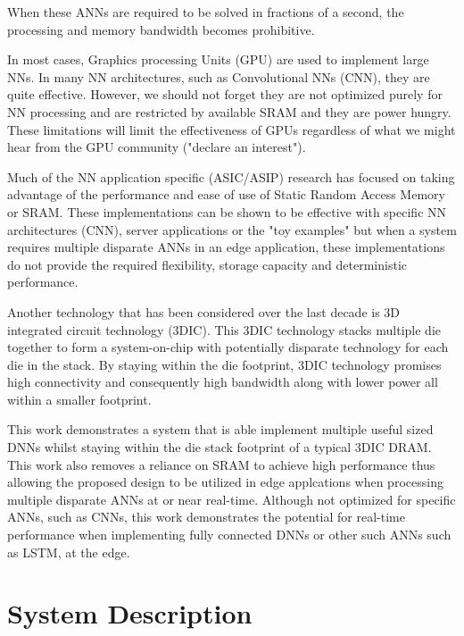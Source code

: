 \documentclass[journal]{IEEEtran}
\begin{document}
When these ANNs are required to be solved in fractions of a second, the processing and memory bandwidth becomes prohibitive.

In most cases, Graphics processing Units (GPU) are used to implement large NNs. In many NN architectures, such as Convolutional NNs (CNN), they are quite effective. However, we should not forget they are not optimized purely for 
NN processing and are restricted by available SRAM and they are power hungry. These limitations will limit the effectiveness of GPUs regardless of what we might hear from the GPU community ("declare an interest").

Much of the NN application specific (ASIC/ASIP) research has focused on taking advantage of the performance and ease of use of Static Random Access Memory or SRAM. 
These implementations can be shown to be effective with specific NN architectures (CNN), server applications or the "toy examples" but when a system requires multiple disparate ANNs in an edge application, 
these implementations do not provide the required flexibility, storage capacity and deterministic performance.

Another technology that has been considered over the last decade is 3D integrated circuit technology (3DIC). 
This 3DIC technology stacks multiple die together to form a system-on-chip with potentially disparate technology for each die in the stack.
By staying within the die footprint, 3DIC technology promises high connectivity and consequently high bandwidth along with lower power all within a smaller footprint.

This work demonstrates a system that is able implement multiple useful sized DNNs whilst staying within the die stack footprint of a typical 3DIC DRAM.
This work also removes a reliance on SRAM to achieve high performance thus allowing the proposed design to be utilized in edge applcations when processing multiple disparate ANNs at or near real-time.
Although not optimized for specific ANNs, such as CNNs, this work demonstrates the potential for real-time performance when implementing fully connected DNNs or other such ANNs such as LSTM, at the edge.


\section{System Description}
\label{System Description}

\end{document}
